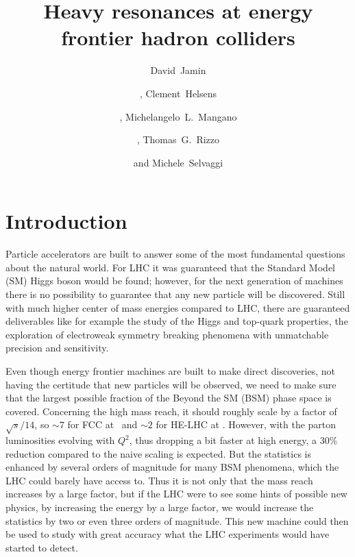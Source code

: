 \documentclass[a4paper,11pt]{article}
\title{\boldmath Heavy resonances at energy frontier hadron colliders}
\author[a,c]{David~Jamin}
\author[a]{\!\!, Clement~Helsens}
\author[a]{\!\!, Michelangelo~L.~Mangano}
\author[b]{\!\!, Thomas~G.~Rizzo}
\author[a]{and Michele~Selvaggi}
\affiliation[a]{CERN, CH-1211 Geneva 23, Switzerland}
\affiliation[b]{SLAC National Accelerator Laboratory 2575 Sand Hill Rd., Menlo Park, CA, 94025 USA}
\affiliation[c]{Academia Sinica, Institute of  Physics, Taipei, Taiwan}
\begin{document}
\maketitle
\flushbottom

\section{Introduction}
\label{sec:intro}
Particle accelerators are built to answer some of the most fundamental questions about the natural world. For LHC it was guaranteed that the Standard Model (SM) Higgs boson would be found; however, for the next generation of machines there is no possibility to guarantee that any new particle will be discovered. Still with much higher center of mass energies compared to LHC, there are guaranteed deliverables like for example the study of the Higgs and top-quark properties, the exploration of electroweak symmetry breaking phenomena with unmatchable precision and sensitivity.

Even though energy frontier machines are built to make direct discoveries, not having the certitude that new particles will be observed, we need to make sure that the largest possible fraction of the Beyond the SM (BSM) phase space is covered. Concerning the high mass reach, it should roughly scale by a factor of $\sqrt{s}/14$, so $\sim 7$ for FCC at \sqrtsfcc\ and $\sim 2$ for HE-LHC at \sqrtshelhc. However, with the parton luminosities evolving with $Q^2$, thus dropping a bit faster at high energy, a 30\% reduction compared to the naive scaling is expected. But the statistics is enhanced by several orders of magnitude for many BSM phenomena, which the LHC could barely have access to. Thus it is not only that the mass reach increases by a large factor, but if the LHC were to see some hints of possible new physics, by increasing the energy by a large factor, we would increase the statistics by two or even three orders of magnitude. This new machine could then be used to study with great accuracy what the LHC experiments would have started to detect. 
\end{document}
